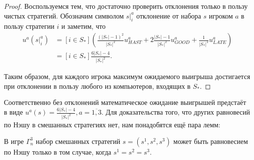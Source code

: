 \begin{proof}
	Воспользуемся тем, что достаточно проверить отклонения только в пользу чистых стратегий. Обозначим символом $\left. s \right|^a_i$ отклонение от набора $s$ игроком $a$ в пользу стратегии $i$ и заметим, что 
	\begin{align*}
		u^a(\left. s \right|^a_i) &= [i \in S_*] \left(\frac{(\left| S_* \right| - 1)^2}{\left| S_* \right|^2} u^a_{HAST} + 2 \frac{\left| S_* \right| - 1}{\left| S_* \right|^2} u^a_{GOOD} + \frac{1}{\left| S_* \right|^2} u^a_{LATE}\right)\\
		&= [i \in S_*] \frac{6 \left| S_* \right| - 4}{\left| S_* \right|^2}.
	\end{align*}
	
	Таким образом, для каждого игрока максимум ожидаемого выигрыша достигается при отклонении в пользу любого из компьютеров, входящих в $S_*$.
\end{proof}

Соответственно без отклонений математическое ожидание выигрышей предстаёт в виде $u^a(s) = \frac{6 \left| S_* \right| - 4}{\left| S_* \right|^2}, a = \overline{1,3}$. Для доказательства того, что других равновесий по Нэшу в смешанных стратегиях нет, нам понадобятся ещё пара лемм:

\begin{lemma}
	В игре $\Gamma^3_n$ набор смешанных стратегий $s = (s^1, s^2, s^3)$ может быть равновесием по Нэшу только в том случае, когда $s^1 = s^2 = s^3$.
\end{lemma}

